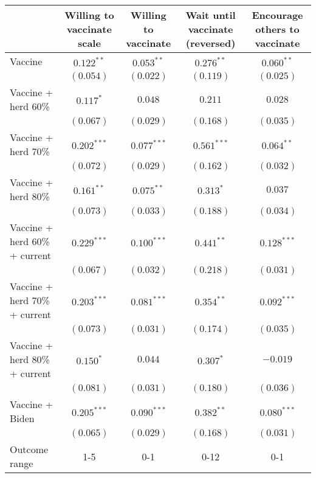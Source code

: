 \begin{table}
\begin{center}
\begin{tabular}{l c c c c}
\hline
 & Willing to vaccinate scale & Willing to vaccinate & Wait until vaccinate (reversed) & Encourage others to vaccinate \\
\hline
Vaccine                       & $0.122^{**}$  & $0.053^{**}$  & $0.276^{**}$  & $0.060^{**}$  \\
                              & $(0.054)$     & $(0.022)$     & $(0.119)$     & $(0.025)$     \\
Vaccine + herd 60\%           & $0.117^{*}$   & $0.048$       & $0.211$       & $0.028$       \\
                              & $(0.067)$     & $(0.029)$     & $(0.168)$     & $(0.035)$     \\
Vaccine + herd 70\%           & $0.202^{***}$ & $0.077^{***}$ & $0.561^{***}$ & $0.064^{**}$  \\
                              & $(0.072)$     & $(0.029)$     & $(0.162)$     & $(0.032)$     \\
Vaccine + herd 80\%           & $0.161^{**}$  & $0.075^{**}$  & $0.313^{*}$   & $0.037$       \\
                              & $(0.073)$     & $(0.033)$     & $(0.188)$     & $(0.034)$     \\
Vaccine + herd 60\% + current & $0.229^{***}$ & $0.100^{***}$ & $0.441^{**}$  & $0.128^{***}$ \\
                              & $(0.067)$     & $(0.032)$     & $(0.218)$     & $(0.031)$     \\
Vaccine + herd 70\% + current & $0.203^{***}$ & $0.081^{***}$ & $0.354^{**}$  & $0.092^{***}$ \\
                              & $(0.073)$     & $(0.031)$     & $(0.174)$     & $(0.035)$     \\
Vaccine + herd 80\% + current & $0.150^{*}$   & $0.044$       & $0.307^{*}$   & $-0.019$      \\
                              & $(0.081)$     & $(0.031)$     & $(0.180)$     & $(0.036)$     \\
Vaccine + Biden               & $0.205^{***}$ & $0.090^{***}$ & $0.382^{**}$  & $0.080^{***}$ \\
                              & $(0.065)$     & $(0.029)$     & $(0.168)$     & $(0.031)$     \\
\hline
Outcome range                 & 1-5           & 0-1           & 0-12          & 0-1           \\

\end{tabular}
\end{center}
\end{table}
